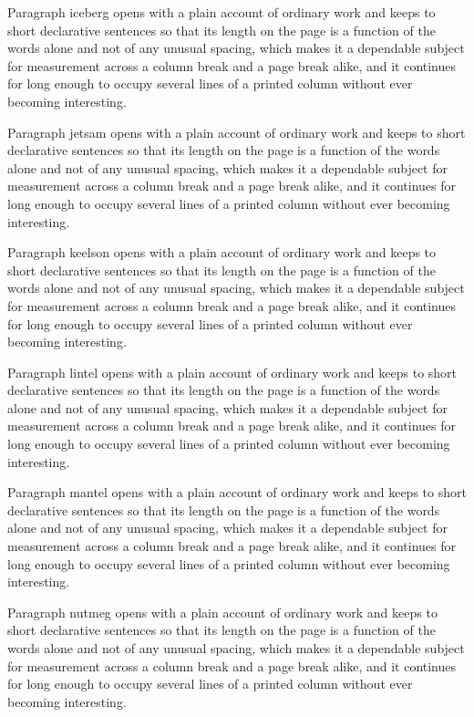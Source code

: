 \documentclass{article}
\begin{document}
Paragraph iceberg opens with a plain account of ordinary work and keeps to short declarative sentences so that its length on the page is a function of the words alone and not of any unusual spacing, which makes it a dependable subject for measurement across a column break and a page break alike, and it continues for long enough to occupy several lines of a printed column without ever becoming interesting.

Paragraph jetsam opens with a plain account of ordinary work and keeps to short declarative sentences so that its length on the page is a function of the words alone and not of any unusual spacing, which makes it a dependable subject for measurement across a column break and a page break alike, and it continues for long enough to occupy several lines of a printed column without ever becoming interesting.

Paragraph keelson opens with a plain account of ordinary work and keeps to short declarative sentences so that its length on the page is a function of the words alone and not of any unusual spacing, which makes it a dependable subject for measurement across a column break and a page break alike, and it continues for long enough to occupy several lines of a printed column without ever becoming interesting.

Paragraph lintel opens with a plain account of ordinary work and keeps to short declarative sentences so that its length on the page is a function of the words alone and not of any unusual spacing, which makes it a dependable subject for measurement across a column break and a page break alike, and it continues for long enough to occupy several lines of a printed column without ever becoming interesting.

Paragraph mantel opens with a plain account of ordinary work and keeps to short declarative sentences so that its length on the page is a function of the words alone and not of any unusual spacing, which makes it a dependable subject for measurement across a column break and a page break alike, and it continues for long enough to occupy several lines of a printed column without ever becoming interesting.

Paragraph nutmeg opens with a plain account of ordinary work and keeps to short declarative sentences so that its length on the page is a function of the words alone and not of any unusual spacing, which makes it a dependable subject for measurement across a column break and a page break alike, and it continues for long enough to occupy several lines of a printed column without ever becoming interesting.
\end{document}

